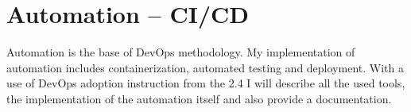 \chapter{Automation -- CI/CD} Automation is the base of DevOps methodology. My implementation of automation includes containerization, automated testing and deployment. With a use of DevOps adoption instruction from the 2.4 I will describe all the used tools, the implementation of the automation itself and also provide a documentation.










